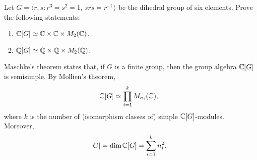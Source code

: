 \begin{exercise}
\label{xca:isos_dihedral}
	Let $G=\langle r,s:r^3=s^2=1,\,srs=r^{-1}\rangle$ be the dihedral group of six elements. 
	Prove the following statements:
	\begin{enumerate}
	    \item $\mathbb{C}[G]\simeq\mathbb{C}\times\mathbb{C}\times M_2(\mathbb{C})$.
	    \item $\mathbb{Q}[G]\simeq\mathbb{Q}\times\mathbb{Q}\times M_2(\mathbb{Q})$.
	\end{enumerate}  
\end{exercise}



Maschke's theorem states that, if $G$ is a finite group, 
then the group algebra $\mathbb{C}[G]$ is semisimple. By Mollien's theorem, 
\[
\mathbb{C}[G]\simeq \prod_{i=1}^k M_{n_i}(\mathbb{C}),
\]
where $k$ is the number of (isomorphism classes of) 
simple $\mathbb{C}[G]$-modules. Moreover, 
\[
|G|=\dim\mathbb{C}[G]=\sum_{i=1}^k n_i^2.
\]

